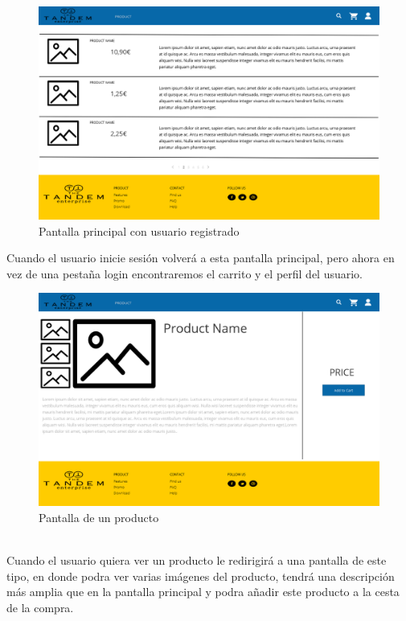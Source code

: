 \documentclass{article}
\begin{document}
\newpage

\begin{figure}[h]
    \centering
    \includegraphics[scale=0.25]{mockup/Inicio_loged.png}
    \caption{Pantalla principal con usuario registrado}
    \label{Fig:Inicio_loged}
\end{figure}
\quad Cuando el usuario inicie sesión volverá a esta pantalla principal, pero ahora en vez de una pestaña login encontraremos el carrito y el perfil del usuario.
\begin{figure}[h]
    \centering
    \includegraphics[scale=0.25]{mockup/product_view.png}
    \caption{Pantalla de un producto}
    \label{Fig:product_view}
\end{figure}\\
\quad Cuando el usuario quiera ver un producto le redirigirá a una pantalla de este tipo, en donde podra ver varias imágenes del producto, tendrá una descripción más amplia que en la pantalla principal y podra añadir este producto a la cesta de la compra.
\end{document}
